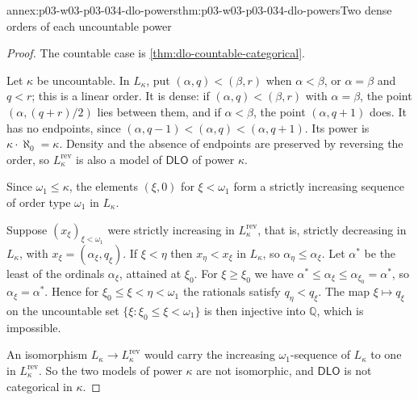 \begin{annexitem}{annex:p03-w03-p03-034-dlo-powers}{thm:p03-w03-p03-034-dlo-powers}{Two dense orders of each uncountable power}
\begin{proof}
The countable case is \cref{thm:dlo-countable-categorical}.

Let \(\kappa\) be uncountable. In \(L_\kappa\), put
\((\alpha,q)<(\beta,r)\) when \(\alpha<\beta\), or \(\alpha=\beta\) and
\(q<r\); this is a linear order. It is dense: if
\((\alpha,q)<(\beta,r)\) with \(\alpha=\beta\), the point
\((\alpha,(q+r)/2)\) lies between them, and if \(\alpha<\beta\), the point
\((\alpha,q+1)\) does. It has no endpoints, since
\((\alpha,q-1)<(\alpha,q)<(\alpha,q+1)\). Its power is
\(\kappa\cdot\aleph_0=\kappa\). Density and the absence of endpoints are
preserved by reversing the order, so \(L_\kappa^{\mathrm{rev}}\) is also a
model of \(\mathsf{DLO}\) of power \(\kappa\).

Since \(\omega_1\leq\kappa\), the elements \((\xi,0)\) for \(\xi<\omega_1\)
form a strictly increasing sequence of order type \(\omega_1\) in
\(L_\kappa\).

Suppose \((x_\xi)_{\xi<\omega_1}\) were strictly increasing in
\(L_\kappa^{\mathrm{rev}}\), that is, strictly decreasing in \(L_\kappa\),
with \(x_\xi=(\alpha_\xi,q_\xi)\). If \(\xi<\eta\) then
\(x_\eta<x_\xi\) in \(L_\kappa\), so \(\alpha_\eta\leq\alpha_\xi\). Let
\(\alpha^*\) be the least of the ordinals \(\alpha_\xi\), attained at
\(\xi_0\). For \(\xi\geq\xi_0\) we have
\(\alpha^*\leq\alpha_\xi\leq\alpha_{\xi_0}=\alpha^*\), so
\(\alpha_\xi=\alpha^*\). Hence for \(\xi_0\leq\xi<\eta<\omega_1\) the
rationals satisfy \(q_\eta<q_\xi\). The map \(\xi\mapsto q_\xi\) on the
uncountable set \(\{\xi:\xi_0\leq\xi<\omega_1\}\) is then injective into
\(\mathbb Q\), which is impossible.

An isomorphism \(L_\kappa\to L_\kappa^{\mathrm{rev}}\) would carry the
increasing \(\omega_1\)-sequence of \(L_\kappa\) to one in
\(L_\kappa^{\mathrm{rev}}\). So the two models of power \(\kappa\) are not
isomorphic, and \(\mathsf{DLO}\) is not categorical in \(\kappa\).
\end{proof}
\end{annexitem}


